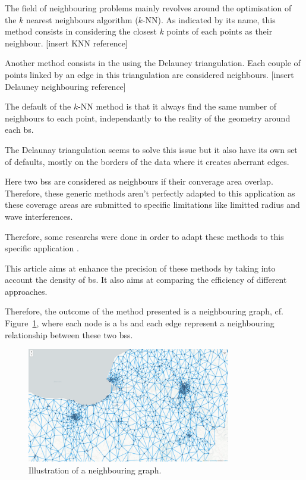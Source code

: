 \documentclass[lettersize,journal,english]{IEEEtran}
\begin{document}
    The field of neighbouring problems mainly revolves around the optimisation of the $k$ nearest neighbours algorithm ($k$-NN).
    As indicated by its name, this method consists in considering the closest $k$ points of each points as their neighbour.
    [insert KNN reference]

    Another method consists in the using the Delauney triangulation. Each couple of points linked by an edge in this triangulation are considered neighbours.
    [insert Delauney neighbouring reference]

    The default of the $k$-NN method is that it always find the same number of neighbours to each point, independantly to the reality of the geometry around each \acrshort{bs}.
    
    The Delaunay triangulation seems to solve this issue but it also have its own set of defaults, mostly on the borders of the data where it creates aberrant edges.

    Here two \acrshort{bs}s are considered as neighbours if their converage area overlap. Therefore, these generic methods aren't perfectly adapted to this application as these coverage areas are submitted to specific limitations like limitted radius and wave interferences.

    Therefore, some researchs were done in order to adapt these methods to this specific application \cite{patent_neighs}.

    This article aims at enhance the precision of these methods by taking into account the density of \acrshort{bs}. It also aims at comparing the efficiency of different approaches. 

    Therefore, the outcome of the method presented is a neighbouring graph, cf. Figure~\ref{fig:neigh_graph}, where each node is a \acrshort{bs} and each edge represent a neighbouring relationship between these two \acrshort{bs}s.
    \begin{figure}
        \centering
        \includegraphics[width=3.5in]{images/illus_graphs/neighbouring_graph.png}
        \caption{Illustration of a neighbouring graph.}
        \label{fig:neigh_graph}
    \end{figure}
\end{document}
